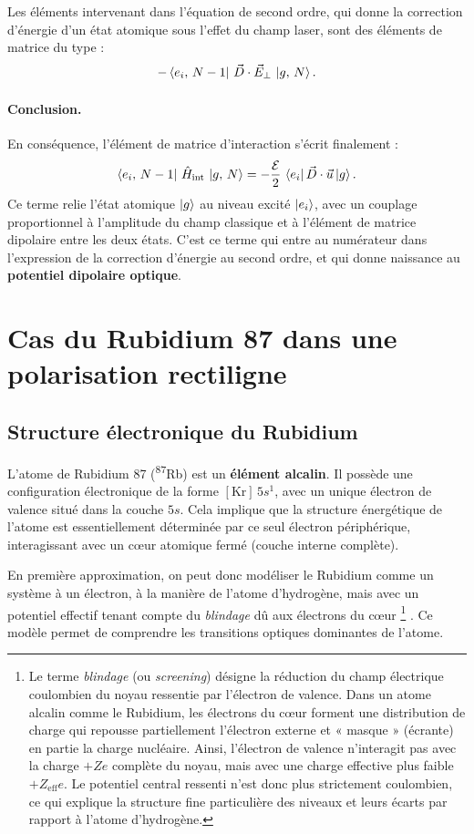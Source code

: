 Les éléments intervenant dans l’équation de second ordre, qui donne la correction d’énergie d’un état atomique sous l’effet du champ laser, sont des éléments de matrice du type :
\[
-\bra{e_i,\,N-1}\,\vec{D} \cdot \vec{E}_\perp\,\ket{g,\,N}.
\]

\paragraph{Conclusion.} En conséquence, l’élément de matrice d’interaction s’écrit finalement :
\[
\bra{e_i,\,N-1} \, \hat H_{\text{int}} \, \ket{g,\,N}
= - \frac{\mathcal{E}}{2} \, \bra{e_i} \vec{D}\cdot \vec{u} \ket{g}.
\]
Ce terme relie l’état atomique \( \ket{g} \) au niveau excité \( \ket{e_i} \), avec un couplage proportionnel à l’amplitude du champ classique et à l’élément de matrice dipolaire entre les deux états. C’est ce terme qui entre au numérateur dans l’expression de la correction d’énergie au second ordre, et qui donne naissance au \textbf{potentiel dipolaire optique}.


\section{Cas du Rubidium 87 dans une polarisation rectiligne}

\subsection{Structure électronique du Rubidium}

L’atome de Rubidium 87 (\textsuperscript{87}Rb) est un \textbf{élément alcalin}. Il possède une configuration électronique de la forme $[ \mathrm{Kr} ]\,5s^1$, avec un unique électron de valence situé dans la couche $5s$. Cela implique que la structure énergétique de l’atome est essentiellement déterminée par ce seul électron périphérique, interagissant avec un cœur atomique fermé (couche interne complète).

En première approximation, on peut donc modéliser le Rubidium comme un système à un électron, à la manière de l’atome d’hydrogène, mais avec un potentiel effectif tenant compte du \emph{blindage} dû aux électrons du cœur \footnote{
Le terme \emph{blindage} (ou \emph{screening}) désigne la réduction du champ électrique 
coulombien du noyau ressentie par l’électron de valence.  
Dans un atome alcalin comme le Rubidium, les électrons du cœur forment une distribution de charge 
qui repousse partiellement l’électron externe et « masque » (écrante) en partie la charge nucléaire.  
Ainsi, l’électron de valence n’interagit pas avec la charge $+Ze$ complète du noyau, 
mais avec une charge effective plus faible $+Z_{\mathrm{eff}}e$.  
Le potentiel central ressenti n’est donc plus strictement coulombien, ce qui explique 
la structure fine particulière des niveaux et leurs écarts par rapport à l’atome d’hydrogène.}
. Ce modèle permet de comprendre les transitions optiques dominantes de l’atome.

